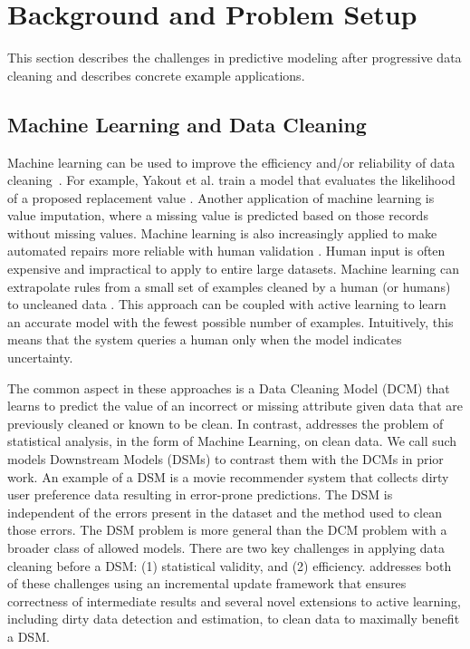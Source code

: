 \section{Background and Problem Setup}\label{background}
This section describes the challenges in predictive modeling after progressive data 
cleaning and describes concrete example applications.

\subsection{Machine Learning and Data Cleaning}\label{alrw}
Machine learning can be used to improve the efficiency and/or reliability of data cleaning~\cite{yakout2013don,gokhale2014corleone}.
For example, Yakout et al. train a model that evaluates the likelihood of a proposed replacement value \cite{yakout2013don}.
Another application of machine learning is value imputation, where a missing value is predicted based on those records without missing values.
Machine learning is also increasingly applied to make automated repairs more reliable with human validation \cite{DBLP:journals/pvldb/YakoutENOI11}.
Human input is often expensive and impractical to apply to entire large datasets.
Machine learning can extrapolate rules from a small set of examples cleaned by a human (or humans) to uncleaned data \cite{gokhale2014corleone, DBLP:journals/pvldb/YakoutENOI11}.
This approach can be coupled with active learning \cite{DBLP:journals/pvldb/MozafariSFJM14} to learn an accurate model with the fewest possible number of examples.
Intuitively, this means that the system queries a human only when the model indicates uncertainty.

The common aspect in these approaches is a Data Cleaning Model (DCM) that learns to predict the value of an incorrect or missing attribute given data that are previously cleaned or known to be clean.
In contrast, \sys addresses the problem of statistical analysis, in the form of Machine Learning, on clean data.
We call such models Downstream Models (DSMs) to contrast them with the DCMs in prior work.
An example of a DSM is a movie recommender system that collects dirty user preference data resulting in error-prone predictions.
The DSM is independent of the errors present in the dataset and the method used to clean those errors.
The DSM problem is more general than the DCM problem with a broader class of allowed models.
There are two key challenges in applying data cleaning before a DSM: (1) statistical validity, and (2) efficiency. 
\sys addresses both of these challenges using an incremental update framework that ensures correctness of intermediate results and several novel extensions to active learning, including dirty data detection and estimation, to clean data to maximally benefit a DSM.

